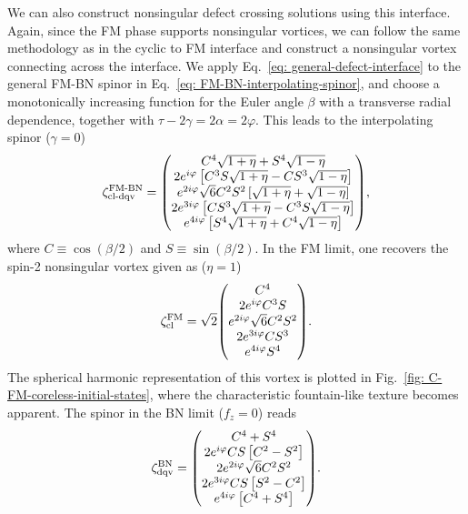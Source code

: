 We can also construct nonsingular defect crossing solutions using this interface.
Again, since the FM phase supports nonsingular vortices, we can follow
the same methodology as in the cyclic to FM interface and construct a
nonsingular vortex connecting across the interface.
We apply Eq.~\eqref{eq: general-defect-interface} to the general FM-BN spinor
in Eq.~\eqref{eq: FM-BN-interpolating-spinor}, and choose a monotonically
increasing function for the Euler angle \(\beta\) with a transverse
radial dependence, together with \(\tau - 2\gamma = 2\alpha = 2\varphi \).
This leads to the interpolating spinor
(\(\gamma=0\))
\begin{align}\label{eq: FM-BN-coreless-dqv}
    \zeta^\text{FM-BN}_\text{cl-dqv} = \mqty(
    C^4\sqrt{1+\eta} + S^4\sqrt{1-\eta} \\
    2e^{i\varphi}\left[C^3S\sqrt{1+\eta}
        - CS^3\sqrt{1-\eta}\right] \\
    e^{2i\varphi}\sqrt{6}C^2S^2\left[\sqrt{1+\eta}
        + \sqrt{1-\eta} \right] \\
    2e^{3i\varphi}\left[CS^3\sqrt{1+\eta}
        - C^3S\sqrt{1-\eta}\right] \\
    e^{4i\varphi}\left[S^4\sqrt{1+\eta} + C^4\sqrt{1-\eta} \right]
    ),
\end{align}
where \(C \equiv \cos(\beta/2)\) and \(S \equiv \sin(\beta/2)\).
In the FM limit, one recovers the spin-2 nonsingular vortex given as
(\(\eta=1\))
\begin{align}\label{eq: FM-BN-coreless}
    \zeta^\text{FM}_\text{cl} = \sqrt{2}\mqty(C^4 \\ 2e^{i\varphi}C^3S \\
    e^{2i\varphi}\sqrt{6}C^2S^2 \\ 2e^{3i\varphi}CS^3 \\ e^{4i\varphi}S^4
    ).
\end{align}
The spherical harmonic representation of this vortex is plotted in
Fig.~\ref{fig: C-FM-coreless-initial-states}, where the characteristic
fountain-like texture becomes apparent.
The spinor in the BN limit (\(f_z=0\)) reads
\begin{align}\label{eq: FM-BN-DQV}
    \zeta^\text{BN}_\text{dqv} = \mqty(
    C^4 + S^4 \\
    2e^{i\varphi}CS\left[C^2-S^2\right] \\
    2e^{2i\varphi}\sqrt{6}C^2S^2 \\
    2e^{3i\varphi}CS\left[S^2 - C^2\right] \\
    e^{4i\varphi}\left[C^4 + S^4\right]).
\end{align}
